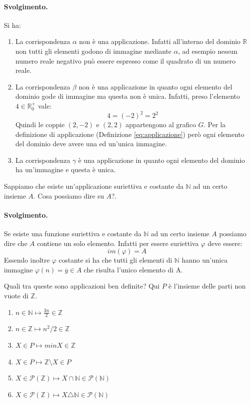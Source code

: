 \paragraph*{Svolgimento.} Si ha:
\begin{enumerate}
	\item La corrispondenza $\alpha$ non è una applicazione. Infatti all'interno del dominio $\mathbb{R}$ non tutti gli elementi godono di immagine mediante $\alpha$, ad esempio nessun numero reale negativo può essere espresso come il quadrato di un numero reale.
	\item La corrispondenza $\beta$ non è una applicazione in quanto ogni elemento del dominio gode di immagine ma questa non è unica. Infatti, preso l'elemento $4 \in \mathbb{R}_{0}^{+}$ vale:
	\begin{displaymath}
		4 = (-2)^{2} = 2^{2}
	\end{displaymath}
	Quindi le coppie $(2,-2)$ e $(2,2)$ appartengono al grafico $G$. Per la definizione di applicazione (Definizione \ref{eq:applicazione}) però ogni elemento del dominio deve avere una ed un'unica immagine.
	\item La corrispondenza $\gamma$ è una applicazione in quanto ogni elemento del dominio ha un'immagine e questa è unica. \hfill \blacksquare
\end{enumerate}
\begin{exsbox}
	Sappiamo che esiste un'applicazione suriettiva e costante da $\mathbb{N}$ ad un certo insieme $A$. Cosa possiamo dire su $A$?.
\end{exsbox}
\paragraph{Svolgimento.} Se esiste una funzione suriettiva e costante da $\mathbb{N}$ ad un certo insieme $A$ possiamo dire che $A$ contiene un solo elemento. Infatti per essere suriettiva $\varphi$ deve essere: $$im(\varphi) = A$$Essendo inoltre $\varphi$ costante si ha che tutti gli elementi di $\mathbb{N}$ hanno un'unica immagine $\varphi(n)= \overline{y} \in A$ che risulta l'unico elemento di A. \hfill \blacksquare
\begin{exsbox}
	Quali tra queste sono applicazioni ben definite? Qui $P$ è l'insieme delle parti non vuote di $\mathbb{Z}$.
	\begin{enumerate}
		\item $n \in \mathbb{N} \mapsto \frac{3n}{2} \in \mathbb{Z}$
		\item $n \in \mathbb{Z} \mapsto n^{2}/2 \in \mathbb{Z}$
		\item $X \in P \mapsto minX \in \mathbb{Z}$
		\item $X \in P \mapsto \mathbb{Z} \setminus X \in P$
		\item $X \in \mathcal{P}(\mathbb{Z}) \mapsto X \cap \mathbb{N} \in \mathcal{P}(\mathbb{N})$
		\item $X \in \mathcal{P}(\mathbb{Z}) \mapsto X \triangle \mathbb{N} \in \mathcal{P}(\mathbb{N})$
	\end{enumerate}
\end{exsbox}

